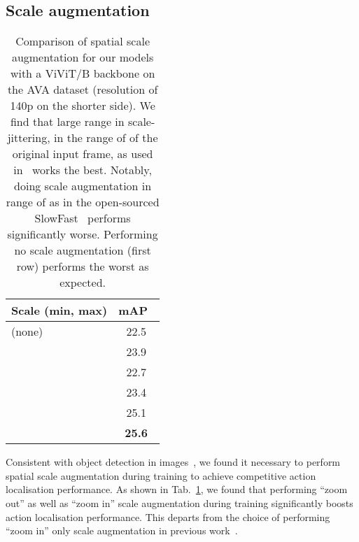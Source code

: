 \documentclass[10pt,twocolumn,letterpaper]{article}
\begin{document}
\subsection{Scale augmentation}
\label{sec:scale_aug}
\begin{table}[t]
\centering
\caption{Comparison of spatial scale augmentation for our models with a ViViT/B backbone on the AVA dataset (resolution of 140p on the shorter side).
We find that large range in scale-jittering, in the range of  of the original input frame, as used in~\cite{ghiasi2021simple} works the best.
Notably, doing scale augmentation in range of  as in the open-sourced SlowFast~\cite{feichtenhofer_iccv_2019} performs significantly worse.
Performing no scale augmentation (first row) performs the worst as expected.
}
\begin{tabular}{lc}
\toprule
Scale (min, max) & mAP~ \\  \midrule
 (none) & 22.5 \\  ~\cite{feichtenhofer_iccv_2019} & 23.9 \\  \midrule
         &  22.7  \\
          &  23.4  \\
         &  25.1  \\
          &  \textbf{25.6}  \\
\bottomrule
\end{tabular}
\label{tab:ablation_scale_aug}
\end{table}
 Consistent with object detection in images~\cite{ghiasi2021simple,lin2017focal,cubuk_arxiv_2019,singh2018sniper}, we found it necessary to perform spatial scale augmentation during training to achieve competitive action localisation performance.
As shown in Tab.~\ref{tab:ablation_scale_aug}, we found that performing ``zoom out'' as well as ``zoom in'' scale augmentation during training significantly boosts action localisation performance.
This departs from the choice of performing ``zoom in'' only scale augmentation in previous work~\cite{feichtenhofer_iccv_2019, wu2022memvit, wu_cvpr_2019}.
\end{document}
